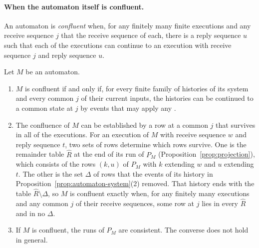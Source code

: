 \paragraph{When the automaton itself is confluent.}
\begin{definition}
\label{def:confluent-automaton}
An automaton is \emph{confluent} when, for any finitely many finite executions
and any receive sequence $j$ that \inrel the receive sequence of each, there
is a reply sequence $u$ such that each of the executions can continue to an
execution with receive sequence $j$ and reply sequence $u$.
\end{definition}

\begin{proposition}
\label{prop:automaton-confluence}
Let $M$ be an automaton.
\begin{enumerate}
  \item $M$ is confluent if and only if, for every finite family of histories
        of its system and every common \indesc $j$ of their current inputs,
        the histories can be continued to a common state at $j$ by events
        that may apply any \commitments.
  \item The confluence of $M$ can be established by a row at a common
        \indesc $j$ that survives in all of the executions.  For an execution
        of $M$ with receive sequence $w$ and reply sequence $t$, two sets of
        rows determine which rows survive.  One is the remainder table
        $\widehat R$ at the end of its run of $P_M$
        (Proposition~\ref{prop:projection}), which consists of the rows
        $(k,u)$ of $P_M$ with $k$ extending $w$ and $u$ extending $t$.  The
        other is the set $\Delta$ of rows that the \commitment events of its
        history in Proposition~\ref{prop:automaton-system}(2) removed.  That
        history ends with the table $\widehat R\setminus\Delta$, so $M$ is
        confluent exactly when, for any finitely many executions and any
        common \indesc $j$ of their receive sequences, some row at $j$ lies in
        every $\widehat R$ and in no $\Delta$.
  \item If $M$ is confluent, the runs of $P_M$ are consistent.  The converse
        does not hold in general.
\end{enumerate}
\end{proposition}

